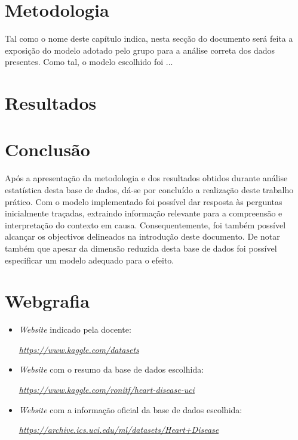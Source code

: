 \documentclass[a4paper]{report}
\begin{document}
\chapter{Metodologia}
\large{
	Tal como o nome deste capítulo indica, nesta secção do documento será feita a exposição do modelo adotado pelo grupo para a análise correta dos dados presentes. Como tal, o modelo 
	escolhido foi ...
}

\chapter{Resultados}

\chapter{Conclusão}
\large{
	Após a apresentação da metodologia e dos resultados obtidos durante análise estatística desta base de dados, dá-se por concluído a realização deste trabalho prático. Com o modelo 
	implementado foi possível dar resposta às perguntas inicialmente traçadas, extraindo informação relevante para a compreensão e interpretação do contexto em causa. Consequentemente, 
	foi também possível alcançar os objectivos delineados na introdução deste documento. De notar também que apesar da dimensão reduzida desta base de dados foi possível especificar um
	modelo adequado para o efeito.
}

\chapter{Webgrafia}
	\begin{itemize}
		\item \textit{Website} indicado pela docente:
		\par \textit{\url{https://www.kaggle.com/datasets}}
        \item \textit{Website} com o resumo da base de dados escolhida:
		\par \textit{\url{https://www.kaggle.com/ronitf/heart-disease-uci}}
		\item \textit{Website} com a informação oficial da base de dados escolhida:
		\par \textit{\url{https://archive.ics.uci.edu/ml/datasets/Heart+Disease}}
    \end{itemize}
\end{document}
